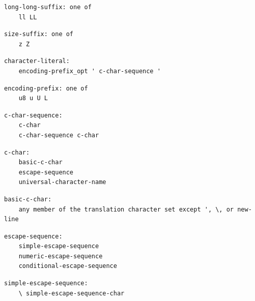 \noindent\textbf{\texttt{}}\par
\begin{lstlisting}
long-long-suffix: one of
    ll LL
\end{lstlisting}

\noindent\textbf{\texttt{}}\par
\begin{lstlisting}
size-suffix: one of
    z Z
\end{lstlisting}

\noindent\textbf{\texttt{}}\par
\begin{lstlisting}
character-literal:
    encoding-prefix_opt ' c-char-sequence '
\end{lstlisting}

\noindent\textbf{\texttt{}}\par
\begin{lstlisting}
encoding-prefix: one of
    u8 u U L
\end{lstlisting}

\noindent\textbf{\texttt{}}\par
\begin{lstlisting}
c-char-sequence:
    c-char
    c-char-sequence c-char
\end{lstlisting}

\noindent\textbf{\texttt{}}\par
\begin{lstlisting}
c-char:
    basic-c-char
    escape-sequence
    universal-character-name
\end{lstlisting}

\noindent\textbf{\texttt{}}\par
\begin{lstlisting}
basic-c-char:
    any member of the translation character set except ', \, or new-line
\end{lstlisting}

\noindent\textbf{\texttt{}}\par
\begin{lstlisting}
escape-sequence:
    simple-escape-sequence
    numeric-escape-sequence
    conditional-escape-sequence
\end{lstlisting}

\noindent\textbf{\texttt{}}\par
\begin{lstlisting}
simple-escape-sequence:
    \ simple-escape-sequence-char
\end{lstlisting}

